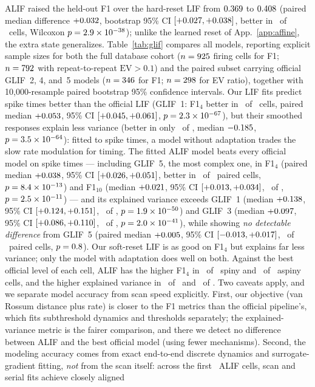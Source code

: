\documentclass[10pt]{article}
\theoremstyle{remark}
\begin{document}
ALIF raised the held-out F1 over the hard-reset LIF from $0.369$ to $0.408$ (paired median difference $+0.032$, bootstrap 95\% CI $[+0.027,+0.038]$, better in \AlifFitWins\ of \AlifFitCells\ cells, Wilcoxon $p=2.9\times10^{-38}$); unlike the learned reset of App.~\ref{app:affine}, the extra state generalizes. Table~\ref{tab:glif} compares all models, reporting explicit sample sizes for both the full database cohort ($n=925$ firing cells for F1; $n=792$ with repeat-to-repeat $\mathrm{EV}>0.1$) and the paired subset carrying official GLIF~2, 4, and~5 models ($n=346$ for F1; $n=298$ for EV ratio), together with 10{,}000-resample paired bootstrap 95\% confidence intervals. Our LIF fits predict spike times better than the official LIF (GLIF~1: F1$_4$ better in \CmpHardGOneFWins\ of \CmpHardGOneFN\ cells, paired median $+0.053$, 95\% CI $[+0.045,+0.061]$, $p=2.3\times10^{-67}$), but their smoothed responses explain less variance (better in only \CmpHardGOneEvWins\ of \CmpHardGOneEvN, median ${-}0.185$, $p=3.5\times10^{-64}$): fitted to spike times, a model without adaptation trades the slow rate modulation for timing. The fitted ALIF model beats every official model on spike times --- including GLIF~5, the most complex one, in F1$_4$ (paired median $+0.038$, 95\% CI $[+0.026,+0.051]$, better in \CmpAlifGFiveFWins\ of \CmpAlifGFiveFN\ paired cells, $p=8.4\times10^{-13}$) and F1$_{10}$ (median $+0.021$, 95\% CI $[+0.013,+0.034]$, \CmpAlifGFiveFTenWins\ of \CmpAlifGFiveFTenN, $p=2.5\times10^{-11}$) --- and its explained variance exceeds GLIF~1 (median $+0.138$, 95\% CI $[+0.124,+0.151]$, \CmpAlifGOneEvWins\ of \CmpAlifGOneEvN, $p=1.9\times10^{-50}$) and GLIF~3 (median $+0.097$, 95\% CI $[+0.086,+0.110]$, \CmpAlifGThreeEvWins\ of \CmpAlifGThreeEvN, $p=2.0\times10^{-41}$), while showing \emph{no detectable difference} from GLIF~5 (paired median $+0.005$, 95\% CI $[{-}0.013,+0.017]$, \CmpAlifGFiveEvWins\ of \CmpAlifGFiveEvN\ paired cells, $p=0.8$). Our soft-reset LIF is as good on F1$_4$ but explains far less variance; only the model with adaptation does well on both. Against the best official level of each cell, ALIF has the higher F1$_4$ in \GlifSpinyAlifBeatsBestF\ of \GlifSpinyN\ spiny and \GlifAspinyAlifBeatsBestF\ of \GlifAspinyN\ aspiny cells, and the higher explained variance in \GlifSpinyAlifBeatsBestEv\ of \GlifSpinyEvN\ and \GlifAspinyAlifBeatsBestEv\ of \GlifAspinyEvN. Two caveats apply, and we separate model accuracy from scan speed explicitly. First, our objective (van Rossum distance plus rate) is closer to the F1 metrics than the official pipeline's, which fits subthreshold dynamics and thresholds separately; the explained-variance metric is the fairer comparison, and there we detect no difference between ALIF and the best official model (using fewer mechanisms). Second, the modeling accuracy comes from exact end-to-end discrete dynamics and surrogate-gradient fitting, \emph{not} from the scan itself: across the first \EqCells\ ALIF cells, scan and serial fits achieve closely aligned 
\end{document}
